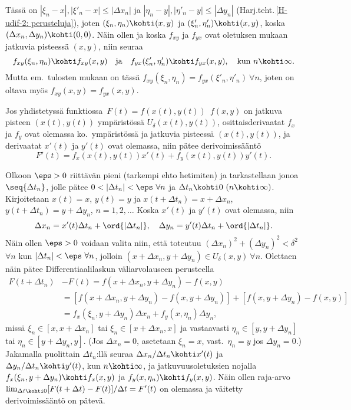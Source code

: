 Tässä on $|\xi_n-x|,|\xi'_n-x|\le|\Delta x_n|$ ja $|\eta_n-y|,|\eta'_n-y|\le|\Delta y_n|$
(Harj.teht.\,\ref{H-udif-2: perusteluja}), joten $(\xi_n,\eta_n)\kohti(x,y)$ ja
$(\xi'_n,\eta'_n)\kohti(x,y)$, koska $(\Delta x_n,\Delta y_n)\kohti(0,0)$. Näin ollen ja koska
$f_{xy}$ ja $f_{yx}$ ovat oletuksen mukaan jatkuvia pisteessä $(x,y)$, niin seuraa
\[
f_{xy}(\xi_n,\eta_n) \kohti f_{xy}(x,y) \quad \text{ja} \quad
f_{yx}(\xi'_n,\eta'_n) \kohti f_{yx}(x,y), \quad \text{kun}\ n\kohti\infty.
\]
Mutta em.\ tulosten mukaan on tässä $f_{xy}(\xi_n,\eta_n)=f_{yx}(\xi'_n,\eta'_n)\ \forall n$,
joten on oltava myös $f_{xy}(x,y)=f_{yx}(x,y)$. \loppu

\begin{Lause} \label{ketjusääntö} 
 Jos yhdistetyssä funktiossa
$\,F(t)=f(x(t),y(t))\,$ $f(x,y)$ on jatkuva pisteen $(x(t),y(t))$ ympäristössä
$U_\delta(x(t),y(t))$, osittaisderivaatat $f_x$ ja $f_y$ ovat olemassa ko.\ ympäristössä ja
jatkuvia pisteessä $(x(t),y(t))$, ja derivaatat $x'(t)$ ja $y'(t)$ ovat olemassa, niin pätee
derivoimissääntö
\[
F'(t)=f_x(x(t),y(t))x'(t)+f_y(x(t),y(t))y'(t).
\]
\end{Lause}
\tod Olkoon $\eps>0$ riittävän pieni (tarkempi ehto hetimiten) ja tarkastellaan jonoa
$\seq{\Delta t_n}$, jolle pätee $0<|\Delta t_n|<\eps\ \forall n$ ja
$\Delta t_n \kohti 0\ (n\kohti\infty)$. Kirjoitetaan $x(t)=x$, $y(t)=y$ ja
$x(t+\Delta t_n)=x+\Delta x_n$, $y(t+\Delta t_n)=y+\Delta y_n$, $n=1,2,\ldots$
Koska $x'(t)$ ja $y'(t)$ ovat olemassa, niin
\[
\Delta x_n = x'(t)\Delta t_n+\ord{|\Delta t_n|}, \quad
\Delta y_n = y'(t)\Delta t_n+\ord{|\Delta t_n|}.
\]
Näin ollen $\eps>0$ voidaan valita niin, että toteutuu $(\Delta x_n)^2+(\Delta y_n)^2<\delta^2$
$\forall n$ kun $|\Delta t_n|<\eps\ \forall n$, jolloin
$(x+\Delta x_n,y+\Delta y_n) \in U_\delta(x,y)\ \forall n$. Olettaen näin pätee
Differentiaalilaskun väliarvolauseen perusteella
\begin{align*}
F(t+\Delta t_n)&-F(t) = f(x+\Delta x_n,y+\Delta y_n)-f(x,y) \\
        &= [f(x+\Delta x_n,y+\Delta y_n)-f(x,y+\Delta y_n)]+[f(x,y+\Delta y_n)-f(x,y)] \\
        &= f_x(\xi_n,y+\Delta y_n)\Delta x_n+f_y(x,\eta_n)\Delta y_n,
\end{align*}
missä $\xi_n\in[x,x+\Delta x_n]$ tai $\xi_n\in[x+\Delta x_n,x]$ ja vastaavasti
$\eta_n\in[y,y+\Delta y_n]$ tai $\eta_n\in[y+\Delta y_n,y]$. (Jos $\Delta x_n=0$, asetetaan
$\xi_n=x$, vast.\ $\eta_n=y$ jos $\Delta y_n=0$.) Jakamalla puolittain $\Delta t_n$:llä
seuraa $\Delta x_n/\Delta t_n \kohti x'(t)$ ja $\Delta y_n/\Delta t_n \kohti y'(t)$, kun
$n\kohti\infty$, ja jatkuvuusoletuksien nojalla $f_x(\xi_n,y+\Delta y_n) \kohti f_x(x,y)$ ja
$f_y(x,\eta_n) \kohti f_y(x,y)$. Näin ollen raja-arvo
$\lim_{\Delta t \kohti 0}[F(t+\Delta t)-F(t)]/\Delta t = F'(t)$ on olemassa ja väitetty
derivoimissääntö on pätevä. \loppu

